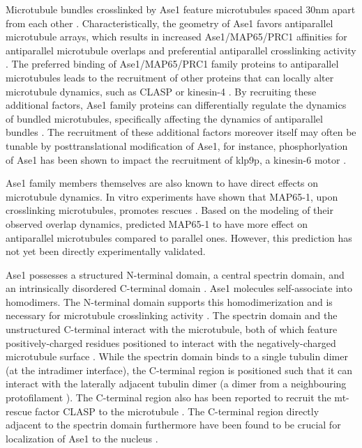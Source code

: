 Microtubule bundles crosslinked by Ase1 feature microtubules spaced 30nm apart from each other . Characteristically, the geometry of Ase1 favors antiparallel microtubule arrays, which results in increased Ase1/MAP65/PRC1 affinities for antiparallel microtubule overlaps and preferential antiparallel crosslinking activity \parencite{She2019,Bieling2010,Janson2007,Subramanian2010,Kellogg2016,Gaillard2008}. The preferred binding of Ase1/MAP65/PRC1 family proteins to antiparallel microtubules leads to the recruitment of other proteins that can locally alter microtubule dynamics, such as CLASP \parencite{Bratman2007b,Liu2009,Kitazawa2014} or kinesin-4 \parencite{Bieling2010, Mani2021}. By recruiting these additional factors, Ase1 family proteins can differentially regulate the dynamics of bundled microtubules, specifically affecting the dynamics of antiparallel bundles \parencite{Bieling2010, Bratman2007b, Thomas2020, Mani2021}. The recruitment of these additional factors moreover itself may often be tunable by posttranslational modification of Ase1, for instance, phosphorlyation of Ase1 has been shown to impact the recruitment of klp9p, a kinesin-6 motor .\par

Ase1 family members themselves are also known to have direct effects on microtubule dynamics. In vitro experiments have shown that MAP65-1, upon crosslinking microtubules, promotes rescues \parencite{Stoppin-Mellet2013}. Based on the modeling of their observed overlap dynamics, \cite{Stoppin-Mellet2013} predicted MAP65-1 to have more effect on antiparallel microtubules compared to parallel ones. However, this prediction has not yet been directly experimentally validated.\par

Ase1 possesses a structured N-terminal domain, a central spectrin domain, and an intrinsically disordered C-terminal domain \parencite{Kapitein2008,Kellogg2016}. Ase1 molecules self-associate into homodimers. The N-terminal domain supports this homodimerization and is necessary for microtubule crosslinking activity \parencite{Janson2007}. The spectrin domain and the unstructured C-terminal interact with the microtubule, both of which feature positively-charged residues positioned to interact with the negatively-charged microtubule surface \parencite{Kellogg2016}. While the spectrin domain binds to a single tubulin dimer (at the intradimer interface), the C-terminal region is positioned such that it can interact with the laterally adjacent tubulin dimer (a dimer from a neighbouring protofilament )\parencite{Kellogg2016}. The C-terminal region also has been reported to recruit the mt-rescue factor CLASP to the microtubule \cite{Bratman2007b}. The C-terminal region directly adjacent to the spectrin domain furthermore have been found to be crucial for localization of Ase1 to the nucleus .\par 

